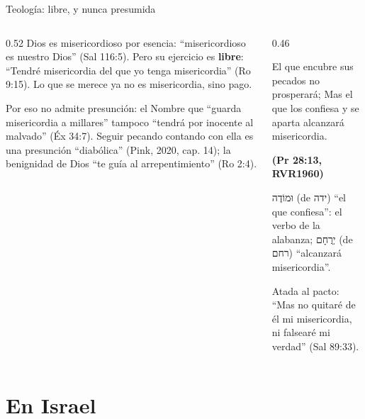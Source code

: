 \documentclass[hyperref={bookmarks=false},aspectratio=169]{beamer}
\newcommand{\heb}[1]{\mbox{\foreignlanguage{hebrew}{#1}}}
\newcommand{\fuente}[1]{\par\hfill{\upshape\bfseries\footnotesize\textcolor{azul}{#1}}}
\newcommand{\destacar}[1]{\textbf{\textcolor{azul}{#1}}}
\begin{document}
\begin{frame}{Teología: libre, y nunca presumida}
\begin{columns}[t,onlytextwidth]
\begin{column}{0.52\textwidth}\small
Dios es misericordioso por esencia: ``misericordioso es nuestro Dios'' (Sal 116:5). Pero su ejercicio es \destacar{libre}: ``Tendré misericordia del que yo tenga misericordia'' (Ro 9:15). Lo que se merece ya no es misericordia, sino pago.\par\medskip
Por eso no admite presunción: el Nombre que ``guarda misericordia a millares'' tampoco ``tendrá por inocente al malvado'' (Éx 34:7). Seguir pecando contando con ella es una presunción ``diabólica'' (Pink, 2020, cap. 14); la benignidad de Dios ``te guía al arrepentimiento'' (Ro 2:4).
\end{column}
\begin{column}{0.46\textwidth}
\begin{cita}El que encubre sus pecados no prosperará; Mas el que los confiesa y se aparta alcanzará misericordia.\fuente{(Pr 28:13, RVR1960)}\end{cita}
\scriptsize\heb{וּמוֹדֶה} (de \heb{ידה}) ``el que confiesa'': el verbo de la alabanza; \heb{יְרֻחָם} (de \heb{רחם}) ``alcanzará misericordia''.\par\smallskip
\small Atada al pacto: ``Mas no quitaré de él mi misericordia, ni falsearé mi verdad'' (Sal 89:33).
\end{column}
\end{columns}
\end{frame}

\section{En Israel}
\end{document}
